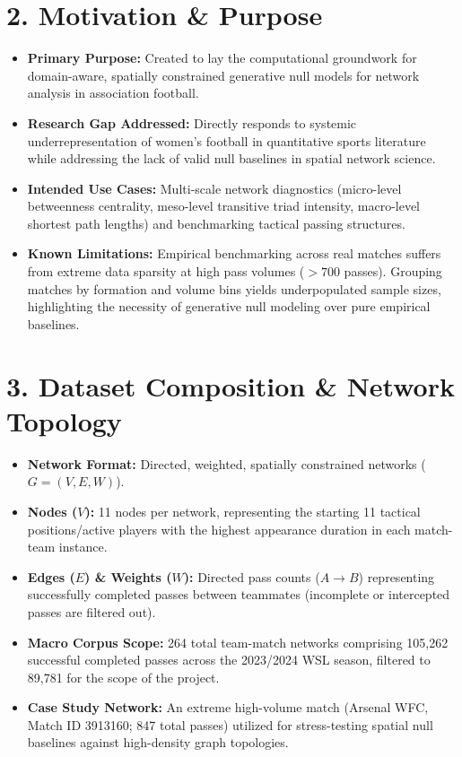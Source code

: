 \documentclass[12pt, a4paper]{article}
\begin{document}
\section*{2. Motivation \& Purpose}
\begin{itemize}
    \item \textbf{Primary Purpose:} Created to lay the computational groundwork for domain-aware, spatially constrained generative null models for network analysis in association football.
    \item \textbf{Research Gap Addressed:} Directly responds to systemic underrepresentation of women's football in quantitative sports literature while addressing the lack of valid null baselines in spatial network science.
    \item \textbf{Intended Use Cases:} Multi-scale network diagnostics (micro-level betweenness centrality, meso-level transitive triad intensity, macro-level shortest path lengths) and benchmarking tactical passing structures.
    \item \textbf{Known Limitations:} Empirical benchmarking across real matches suffers from extreme data sparsity at high pass volumes ($>700$ passes). Grouping matches by formation and volume bins yields underpopulated sample sizes, highlighting the necessity of generative null modeling over pure empirical baselines.
\end{itemize}

\section*{3. Dataset Composition \& Network Topology}
\begin{itemize}
    \item \textbf{Network Format:} Directed, weighted, spatially constrained networks ($G = (V, E, W)$).
    \item \textbf{Nodes ($V$):} 11 nodes per network, representing the starting 11 tactical positions/active players with the highest appearance duration in each match-team instance.
    \item \textbf{Edges ($E$) \& Weights ($W$):} Directed pass counts ($A \to B$) representing successfully completed passes between teammates (incomplete or intercepted passes are filtered out).
    \item \textbf{Macro Corpus Scope:} 264 total team-match networks comprising 105,262 successful completed passes across the 2023/2024 WSL season, filtered to 89,781 for the scope of the project.
    \item \textbf{Case Study Network:} An extreme high-volume match (Arsenal WFC, Match ID 3913160; 847 total passes) utilized for stress-testing spatial null baselines against high-density graph topologies.
\end{itemize}
\end{document}
